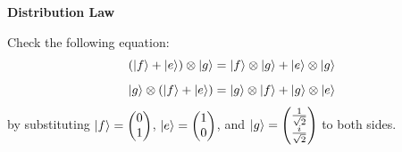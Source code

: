\documentclass[a4paper, 10pt]{article}
\begin{document}
\begin{problem}
\textbf{Distribution Law}
\par Check the following equation:
\[
	\left( \ket{f} + \ket{e} \right) \otimes \ket{g} = \ket{f} \otimes \ket{g} + \ket{e} \otimes \ket{g}
\]
\[
	\ket{g} \otimes \left( \ket{f} + \ket{e} \right) = \ket{g} \otimes \ket{f} + \ket{g} \otimes \ket{e}
\]
by substituting \( \displaystyle \ket{f} = \begin{pmatrix}
	0 \\ 1
\end{pmatrix} \), \( \displaystyle \ket{e} = \begin{pmatrix}
	1 \\ 0
\end{pmatrix} \), and \( \displaystyle \ket{g} = \begin{pmatrix}
	\frac{1}{\sqrt{2}} \\ \frac{i}{\sqrt{2}}
\end{pmatrix} \) to both sides.
\end{problem}
\end{document}
